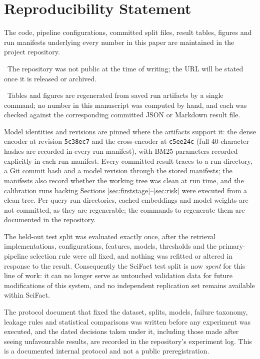 \documentclass[11pt,a4paper]{article}
\newif\ifrepopublic
\newcommand{\repourl}{https://github.com/SaqlainXoas/failure-aware-scientific-retrieval}
\begin{document}
\section{Reproducibility Statement}
\label{sec:reproducibility}

The code, pipeline configurations, committed split files, result tables, figures and run
manifests underlying every number in this paper are maintained in the project repository.%
\ifrepopublic
\ It is available at \url{\repourl}.
\else
\ The repository was not public at the time of writing; the URL will be stated once it is
released or archived.
\fi
\ Tables and figures are regenerated from saved run artifacts by a single command; no number in
this manuscript was computed by hand, and each was checked against the corresponding committed
JSON or Markdown result file.

Model identities and revisions are pinned where the artifacts support it: the dense encoder at
revision \texttt{5c38ec7} and the cross-encoder at \texttt{c5ee24c} (full 40-character hashes are
recorded in every run manifest), with BM25 parameters recorded explicitly in
each run manifest. Every committed result traces to a run directory, a Git commit hash and a
model revision through the stored manifests; the manifests also record whether the working tree
was clean at run time, and the calibration runs backing Sections
\ref{sec:firststage}--\ref{sec:risk} were executed from a clean tree. Per-query run directories,
cached embeddings and model weights are not committed, as they are regenerable; the commands to
regenerate them are documented in the repository.

The held-out test split was evaluated exactly once, after the retrieval implementations,
configurations, features, models, thresholds and the primary-pipeline selection rule were all
fixed, and nothing was refitted or altered in response to the result. Consequently the SciFact
test split is now \emph{spent} for this line of work: it can no longer serve as untouched
validation data for future modifications of this system, and no independent replication set
remains available within SciFact.

The protocol document that fixed the dataset, splits, models, failure taxonomy, leakage rules
and statistical comparisons was written before any experiment was executed, and the dated
decisions taken under it, including those made after seeing unfavourable results, are recorded
in the repository's experiment log. This is a documented internal protocol and not a public
preregistration.



\end{document}
